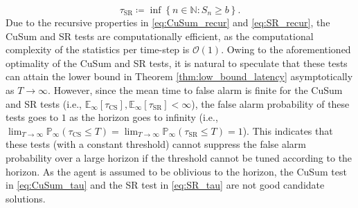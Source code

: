 \documentclass[12pt]{interact}
\newcommand{\lp}{\left(}
\newcommand{\rp}{\right)}
\newcommand{\lb}{\left[}
\newcommand{\rb}{\right]}
\newcommand{\lbp}{\left\{}
\newcommand{\rbp}{\right\}}
\newcommand{\mcal}{\mathcal}
\newcommand{\mrm}{\mathrm}
\newcommand{\mbb}{\mathbb}
\newcommand{\E}{\mathbb{E}}
\renewcommand{\Pr}{\mathbb{P}}
\theoremstyle{plain}
\begin{document}
%
\begin{equation}\label{eq:SR_tau}
    \tau_{\mrm{SR}} \coloneqq \inf\lbp n \in \mbb{N}: S_{n} \geq b \rbp.
\end{equation}
%
Due to the recursive properties in \eqref{eq:CuSum_recur} and \eqref{eq:SR_recur}, the CuSum and SR tests are computationally efficient, as the computational complexity of the statistics per time-step is $\mcal{O}(1)$.
Owing to the aforementioned optimality of the CuSum and SR tests, it is natural to speculate that these tests can attain the lower bound in Theorem \ref{thm:low_bound_latency} asymptotically as $T \to \infty$. 
However, since the mean time to false alarm is finite for the CuSum and SR tests (i.e., $\E_{\infty} \lb \tau_{\mrm{CS}} \rb, \E_{\infty} \lb \tau_{\mrm{SR}} \rb < \infty$), the false alarm probability of these tests goes to $1$ as the horizon goes to infinity (i.e., $\lim_{T \to \infty} \Pr_{\infty}\lp \tau_{\mrm{CS}} \leq T\rp = \lim_{T \to \infty} \Pr_{\infty}\lp \tau_{\mrm{SR}} \leq T\rp = 1$). This indicates that these tests (with a constant threshold) cannot suppress the false alarm probability over a large horizon if the threshold cannot be tuned according to the horizon. As the agent is assumed to be oblivious to the horizon, the CuSum test in \eqref{eq:CuSum_tau} and the SR test in \eqref{eq:SR_tau} are not good candidate solutions. 
\end{document}
